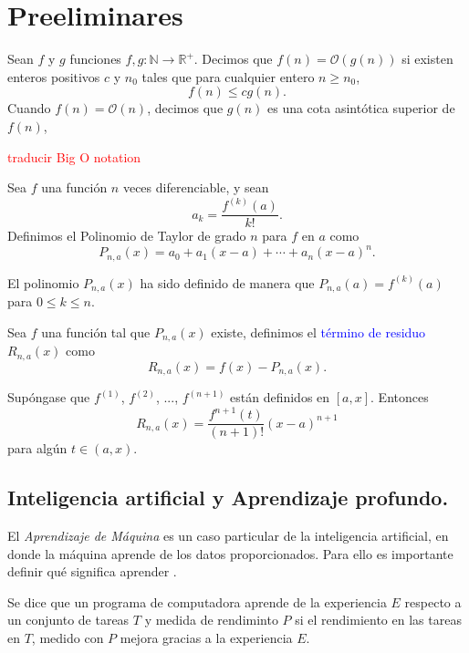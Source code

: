     

    \chapter{Preeliminares}
    \begin{definition}
        Sean $f$ y $g$ funciones $f,g:\mathbb N \to \mathbb R^+$. Decimos que $f(n) = \mathcal O(g(n))$ si existen enteros positivos $c$ y $n_0$ tales que para cualquier entero $n\geq n_0$,
        \begin{equation}
            f(n) \leq cg(n).
        \end{equation}
        Cuando $f(n) = \mathcal O(n)$, decimos que $g(n)$ es una cota asintótica superior de $f(n)$,
    \end{definition}
    \textcolor{red}{traducir Big O notation}

    \begin{definition}
        Sea $f$ una función $n$ veces diferenciable, y sean $$a_k = \frac{f^{(k)}(a)}{k!}.$$
        Definimos el Polinomio de Taylor de grado $n$ para $f$ en $a$ como
        $$P_{n,a}(x) = a_0 + a_1(x-a) + \cdots + a_n(x-a)^n.$$
    \end{definition}
    El polinomio $P_{n,a}(x)$ ha sido definido de manera que $P_{n,a}(a) = f^{(k)}(a)$ para $0\leq k \leq n$.
    \begin{definition}
        Sea $f$ una función tal que $P_{n,a}(x)$ existe, definimos el \textcolor{blue}{término de residuo} $R_{n,a}(x)$ como 
        \begin{equation}
            R_{n,a}(x) = f(x) - P_{n,a}(x).
        \end{equation} 
    \end{definition}
    \begin{theorem}
        Supóngase que $f^{(1)}$, $f^{(2)}$, ..., $f^{(n+1)}$ están definidos en $[a,x]$. Entonces 
        \begin{equation}
            R_{n,a}(x) = \frac{f^{n+1}(t)}{(n+1)!}(x-a)^{n+1}
        \end{equation}
        para algún $t\in (a,x)$.
    \end{theorem}


    \section{Inteligencia artificial y Aprendizaje profundo.}
    El \textsl{Aprendizaje de Máquina} es un caso particular de la inteligencia artificial, en donde la máquina aprende de los datos proporcionados. Para ello es importante definir qué significa aprender \cite{Mitchell}.
    \begin{definition}
        Se dice que un programa de computadora aprende de la experiencia $E$ respecto a un conjunto de tareas $T$ y medida de rendiminto $P$ si el rendimiento en las tareas en $T$, medido con $P$ mejora gracias a la experiencia $E$.
    \end{definition}

